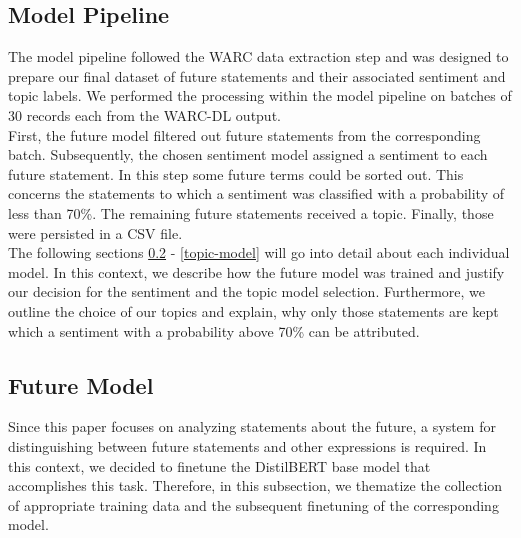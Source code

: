 \subsection{Model Pipeline}
\label{model-pipeline}
The model pipeline followed the WARC data extraction step and was designed to prepare our final dataset of future statements and their associated sentiment and topic labels. We performed the processing within the model pipeline on batches of 30 records each from the WARC-DL output. 
\\
First, the future model filtered out future statements from the corresponding batch. Subsequently, the chosen sentiment model assigned a sentiment to each future statement. In this step some future terms could be sorted out. This concerns the statements to which a sentiment was classified with a probability of less than 70\%. The remaining future statements received a topic. Finally, those were persisted in a CSV file.
\\
The following sections \ref{future-model} - \ref{topic-model} will go into detail about each individual model.
In this context, we describe how the future model was trained and justify our decision for the sentiment and the topic model selection.
Furthermore, we outline the choice of our topics and explain, why only those statements are kept which a sentiment with a probability above 70\% can be attributed.

\subsection{Future Model}
\label{future-model}
Since this paper focuses on analyzing statements about the future, a system for distinguishing between future statements and other expressions is required.
In this context, we decided to finetune the DistilBERT \citep{Sanh2019DistilBERTAD} base model that accomplishes this task.
Therefore, in this subsection, we thematize the collection of appropriate training data and the subsequent finetuning of the corresponding model.

